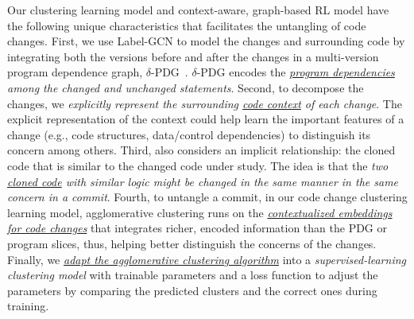 Our clustering learning model and context-aware, graph-based RL model
have the following unique characteristics that facilitates the
untangling of code changes. First, we use Label-GCN to model the
changes and surrounding code by integrating both the versions before
and after the changes in a multi-version program dependence graph,
$\delta$-PDG~\cite{flexeme-fse20}. $\delta$-PDG encodes the {\em
  \underline{program dependencies} among the changed and unchanged
  statements}. Second, to decompose the changes, we {\em explicitly
  represent the surrounding \underline{code context} of each
  change}. The explicit representation of the context could help
{\tool} learn the important features of a change (e.g., code
structures, data/control dependencies) to distinguish its concern
among others.
%
Third, {\tool} also considers an implicit relationship:
the cloned code that is similar to the changed code under study.
%
The idea is that the {\em two \underline{cloned code} with similar
  logic might be changed in the same manner in the same concern in a
  commit}. Fourth, to untangle a commit, in our code change clustering
learning model, agglomerative clustering runs on the {\em
  \underline{contextualized embeddings for code changes}} that integrates richer, encoded information
than the PDG or program slices, thus, helping better distinguish the
concerns of the changes. Finally, we {\em \underline{adapt the
    agglomerative clustering algorithm}} into a {\em
  supervised-learning clustering model} with trainable parameters and
a loss function to adjust the parameters by comparing the predicted
clusters and the correct ones during training.



